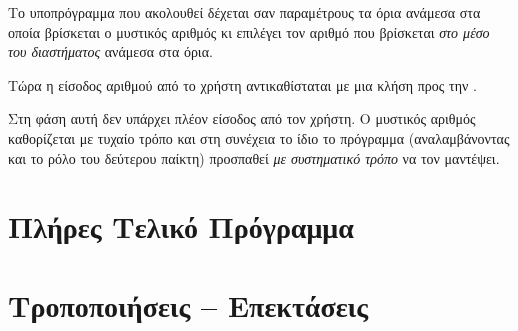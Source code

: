 \documentclass[a4paper,11pt,oneside]{book}
\begin{document}

Το υποπρόγραμμα που ακολουθεί δέχεται σαν παραμέτρους τα όρια ανάμεσα στα οποία βρίσκεται ο μυστικός αριθμός κι επιλέγει τον αριθμό που βρίσκεται \emph{στο μέσο του διαστήματος} ανάμεσα στα όρια. 


Τώρα η είσοδος αριθμού από το χρήστη αντικαθίσταται με μια κλήση προς την . 


Στη φάση αυτή δεν υπάρχει πλέον είσοδος από τον χρήστη. Ο μυστικός αριθμός καθορίζεται με τυχαίο τρόπο και στη συνέχεια το ίδιο το πρόγραμμα (αναλαμβάνοντας και το ρόλο του δεύτερου παίκτη) προσπαθεί \emph{με συστηματικό τρόπο} να τον μαντέψει.



\section{Πλήρες Τελικό Πρόγραμμα}

\tobecontinued



\section{Τροποποιήσεις -- Επεκτάσεις}
\end{document}
